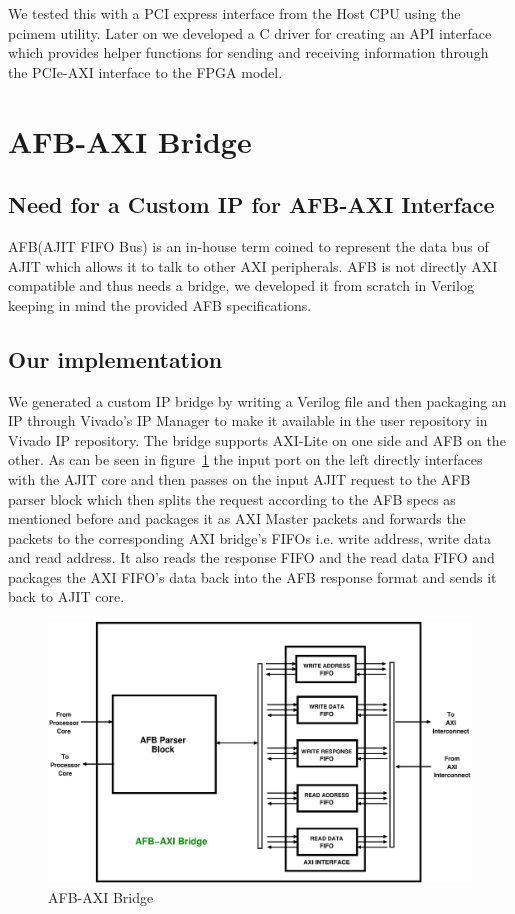 We tested this with a PCI express interface from the Host CPU using the pcimem utility. Later on we developed a C driver for creating an
API interface which provides helper functions for sending and receiving information through the PCIe-AXI interface to the FPGA model.

\section{AFB-AXI Bridge}

\subsection{Need for a Custom IP for AFB-AXI Interface}

AFB(AJIT FIFO Bus) is an in-house term coined to represent the data bus of AJIT which allows it to talk to other AXI peripherals. AFB is not
directly AXI compatible and thus needs a bridge, we developed it from scratch in Verilog keeping in mind the provided AFB specifications.

\subsection{Our implementation}

We generated a custom IP bridge by writing a Verilog file and then packaging an IP through Vivado's IP Manager to make it available in the
user repository in Vivado IP repository. The bridge supports AXI-Lite on one side and AFB on the other. As can be seen in
figure~\ref{AFB-AXI bridge} the input port on the left directly interfaces with the AJIT core and then passes on the input AJIT request to
the AFB parser block which then splits the request according to the AFB specs as mentioned before and packages it as AXI Master packets and
forwards the packets to the corresponding AXI bridge's FIFOs i.e. write address, write data and read address. It also reads the response
FIFO and the read data FIFO and packages the AXI FIFO's data back into the AFB response format and sends it back to AJIT core.

\begin{figure}[H]
\includegraphics[width=\textwidth]{eps_pdf_sources/ajit_fpga/AFB_AXI_bridge/AFB_AXI_bridge_expanded}
\caption{AFB-AXI Bridge}
\label{AFB-AXI bridge}
\end{figure}

